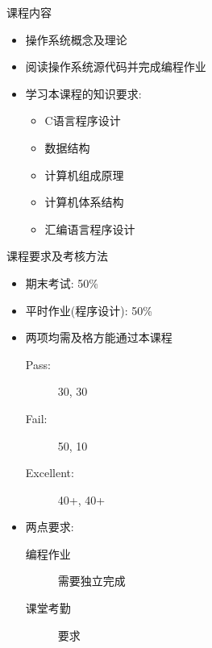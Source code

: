 \documentclass[xcolor=svgnames]{beamer}
\begin{document}
\begin{CJK*}{UTF8}{gbsn}
\begin{frame}{课程内容}
\begin{itemize}
\item 操作系统概念及理论
\item 阅读操作系统源代码并完成编程作业
\item 学习本课程的知识要求:
\begin{itemize}
\item C语言程序设计
\item 数据结构
\item 计算机组成原理
\item 计算机体系结构
\item 汇编语言程序设计
\end{itemize}
\end{itemize}
\end{frame}

\begin{frame}{课程要求及考核方法}
\begin{itemize}
\item 期末考试: 50\%
\item 平时作业(程序设计): 50\%
\item 两项均需及格方能通过本课程
\begin{description}
\item[Pass:] 30, 30
\item[Fail:] 50, 10
\item[Excellent:] 40+, 40+
\end{description}
\item 两点要求:
\begin{description}
\item[编程作业] 需要独立完成
\item[课堂考勤]要求 
\end{description}
\end{itemize}
\end{frame}


\end{CJK*}
\end{document}
